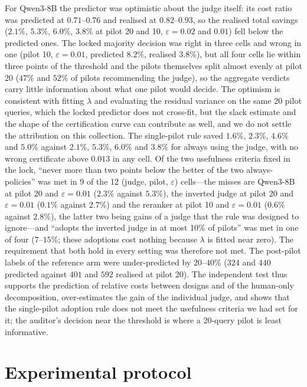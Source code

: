 \documentclass{article}
\newcommand{\eps}{\varepsilon}
\begin{document}
For Qwen3-8B the predictor was optimistic about the judge itself: its cost ratio was predicted at $0.71$--$0.76$ and realised at $0.82$--$0.93$, so the realised total savings ($2.1\%$, $5.3\%$, $6.0\%$, $3.8\%$ at pilot 20 and 10, $\eps=0.02$ and $0.01$) fell below the predicted ones. The locked majority decision was right in three cells and wrong in one (pilot 10, $\eps=0.01$, predicted $8.2\%$, realised $3.8\%$), but all four cells lie within three points of the threshold and the pilots themselves split almost evenly at pilot 20 ($47\%$ and $52\%$ of pilots recommending the judge), so the aggregate verdicts carry little information about what one pilot would decide. The optimism is consistent with fitting $\lambda$ and evaluating the residual variance on the same 20 pilot queries, which the locked predictor does not cross-fit, but the slack estimate and the shape of the certification curve can contribute as well, and we do not settle the attribution on this collection. The single-pilot rule saved $1.6\%$, $2.3\%$, $4.6\%$ and $5.0\%$ against $2.1\%$, $5.3\%$, $6.0\%$ and $3.8\%$ for always using the judge, with no wrong certificate above $0.013$ in any cell. Of the two usefulness criteria fixed in the lock, ``never more than two points below the better of the two always-policies'' was met in 9 of the 12 (judge, pilot, $\eps$) cells---the misses are Qwen3-8B at pilot 20 and $\eps=0.01$ ($2.3\%$ against $5.3\%$), the inverted judge at pilot 20 and $\eps=0.01$ ($0.1\%$ against $2.7\%$) and the reranker at pilot 10 and $\eps=0.01$ ($0.6\%$ against $2.8\%$), the latter two being gains of a judge that the rule was designed to ignore---and ``adopts the inverted judge in at most 10\% of pilots'' was met in one of four ($7$--$15\%$; these adoptions cost nothing because $\lambda$ is fitted near zero). The requirement that both hold in every setting was therefore not met. The post-pilot labels of the reference arm were under-predicted by $20$--$40\%$ ($324$ and $440$ predicted against $401$ and $592$ realised at pilot 20). The independent test thus supports the prediction of relative costs between designs and of the human-only decomposition, over-estimates the gain of the individual judge, and shows that the single-pilot adoption rule does not meet the usefulness criteria we had set for it; the auditor's decision near the threshold is where a 20-query pilot is least informative.

\section{Experimental protocol}\label{sec:protocol}
\end{document}
